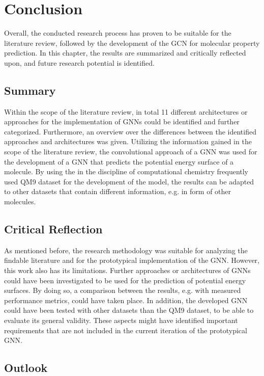 \section{Conclusion}
Overall, the conducted research process has proven to be suitable for the literature review, followed by the development of the GCN for molecular property prediction. In this chapter, the results are summarized and critically reflected upon, and future research potential is identified. 

\subsection{Summary}

Within the scope of the literature review, in total 11 different architectures or approaches for the implementation of GNNs could be identified and further categorized. Furthermore, an overview over the differences between the identified approaches and architectures was given. Utilizing the information gained in the scope of the literature review, the convolutional approach of a GNN was used for the development of a GNN that predicts the potential energy surface of a molecule. By using the in the discipline of computational chemistry frequently used QM9 dataset for the development of the model, the results can be adapted to other datasets that contain different information, e.g. in form of other molecules.  

\subsection{Critical Reflection}
As mentioned before, the research methodology was suitable for analyzing the findable literature and for the prototypical implementation of the GNN. However, this work also has its limitations. Further approaches or architectures of GNNs could have been investigated to be used for the prediction of potential energy surfaces. By doing so, a comparison between the results, e.g. with measured performance metrics, could have taken place. In addition, the developed GNN could have been tested with other datasets than the QM9 dataset, to be able to evaluate its general validity. These aspects might have identified important requirements that are not included in the current iteration of the prototypical GNN.

\subsection{Outlook}

